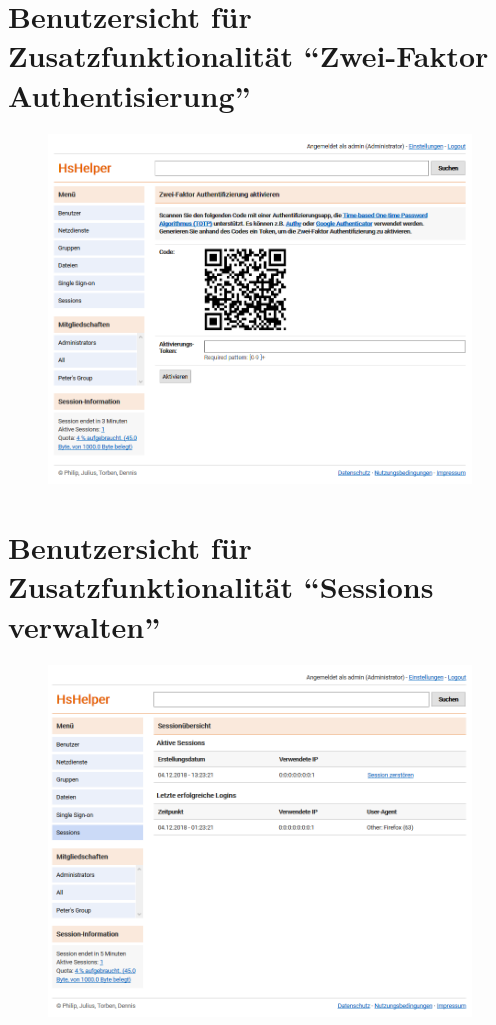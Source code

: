 \documentclass[12pt,DIV14,BCOR10mm,a4paper,parskip=half-,headsepline,headinclude,english,ngerman,bibliography=totocnumbered]{scrreprt}
\begin{document}
\begin{appendices}
\chapter{Benutzersicht für Zusatzfunktionalität \enquote{Zwei-Faktor Authentisierung}}
\begin{figure}[!htb]
	\hspace*{-1cm}
	\includegraphics[width=0.8\paperwidth]{resources/two-auth-factor-manual.png}
	\label{manual:two-auth-factor}
\end{figure}

\chapter{Benutzersicht für Zusatzfunktionalität \enquote{Sessions verwalten}}
\begin{figure}[!htb]
	\hspace*{-1cm}
	\includegraphics[width=0.8\paperwidth]{resources/sessions-manual.png}
  \label{manual:sessions}
\end{figure}

\end{appendices}
\end{document}
